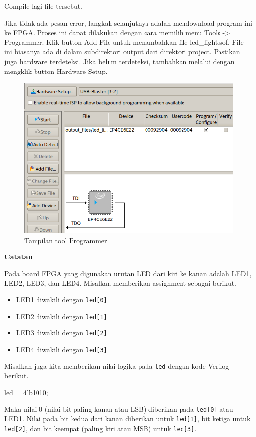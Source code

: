 Compile lagi file tersebut.

Jika tidak ada pesan error, langkah selanjutnya adalah mendownload program
ini ke FPGA. Proses ini dapat dilakukan dengan cara memilih menu
{\sf Tools -> Programmer}.
Klik button {\sf Add File} untuk menambahkan file {\sf led\_light.sof}.
File ini biasanya ada di dalam subdirektori {\sf output} dari direktori
project.
Pastikan juga hardware terdeteksi. Jika belum terdeteksi, tambahkan melalui
dengan mengklik button {\sf Hardware Setup}.

\begin{figure}[H]
\centering
\includegraphics[scale=0.6]{images/Programmer_4LED.png}
\par
\caption{Tampilan tool {\sf Programmer}}
\end{figure}

\textbf{Catatan}

Pada board FPGA yang digunakan urutan LED dari kiri ke kanan adalah LED1,
LED2, LED3, dan LED4.
Misalkan memberikan assignment sebagai berikut.
\begin{itemize}
\item LED1 diwakili dengan {\tt led[0]}
\item LED2 diwakili dengan {\tt led[1]}
\item LED3 diwakili dengan {\tt led[2]}
\item LED4 diwakili dengan {\tt led[3]}
\end{itemize}
Misalkan juga kita memberikan nilai logika pada {\tt led} dengan
kode Verilog berikut.
\begin{verilogcode}
  led = 4'b1010;
\end{verilogcode}
Maka nilai 0 (nilai bit paling kanan atau LSB) diberikan pada {\tt led[0]}
atau LED1. Nilai pada bit kedua dari kanan diberikan untuk {\tt led[1]}, bit ketiga
untuk {\tt led[2]}, dan bit keempat (paling kiri atau MSB) untuk {\tt led[3]}.

